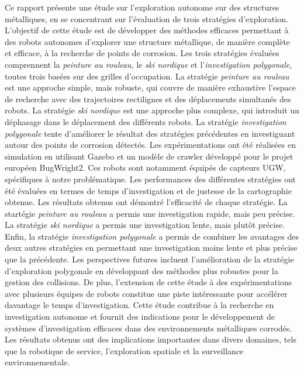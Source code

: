 \documentclass[francais,RandD]{rapportPFE}
\begin{document}
\begin{ResumeMotsCles}
\begin{resumeEn}
{			}
		\end{resumeEn}
		\begin{resumeFr}
			{\scriptsize
				Ce rapport présente une étude sur l'exploration autonome sur des structures métalliques, en se concentrant sur l'évaluation de trois stratégies d'exploration. L'objectif de cette étude est de développer des méthodes efficaces permettant à des robots autonomes d'explorer une structure métallique, de manière complète et efficace, à la recherche de points de corrosion.
				Les trois stratégies évaluées comprennent la \textit{peinture au rouleau}, le \textit{ski nordique} et l'\textit{investigation polygonale}, toutes trois basées sur des grilles d'occupation.
				La stratégie \textit{peinture au rouleau} est une approche simple, mais robuste, qui couvre de manière exhaustive l'espace de recherche avec des trajectoires rectilignes et des déplacements simultanés des robots.
				La stratégie \textit{ski nordique} est une approche plus complexe, qui introduit un déphasage dans le déplacement des différents robots.
				La stratégie \textit{investigation polygonale} tente d'améliorer le résultat des stratégies précédentes en investiguant autour des points de corrosion détectés.
				Les expérimentations ont été réalisées en simulation en utilisant Gazebo et un modèle de crawler développé pour le projet européen BugWright2.
				Ces robots sont notamment équipés de capteurs UGW, spécifiques à notre problématique.
				Les performances des différentes stratégies ont été évaluées en termes de temps d'investigation et de justesse de la cartographie obtenue.
				Les résultats obtenus ont démontré l'efficacité de chaque stratégie.
				La startégie \textit{peinture au rouleau} a permis une investigation rapide, mais peu précise.
				La stratégie \textit{ski nordique} a permis une investigation lente, mais plutôt précise.
				Enfin, la stratégie \textit{investigation polygonale} a permis de combiner les avantages des deux autres stratégies en permettant une investigation moins lente et plus précise que la précédente.
				Les perspectives futures incluent l'amélioration de la stratégie d'exploration polygonale en développant des méthodes plus robustes pour la gestion des collisions.
				De plus, l'extension de cette étude à des expérimentations avec plusieurs équipes de robots constitue une piste intéressante pour accélérer davantage le temps d'investigation.
				Cette étude contribue à la recherche en investigation autonome et fournit des indications pour le développement de systèmes d'investigation efficaces dans des environnements métalliques corrodés.
				Les résultats obtenus ont des implications importantes dans divers domaines, tels que la robotique de service, l'exploration spatiale et la surveillance environnementale.
			}
		\end{resumeFr}
	\end{ResumeMotsCles}
\end{document}
